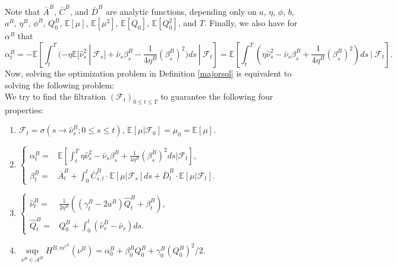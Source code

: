 \documentclass[10pt]{article}
\def \E{\mathbb{E}}
\begin{document}
Note that $\bar A^B$, $\bar C^B$, and $\bar D^B$ are analytic functions, depending only on $a$, $\eta$, $\phi$, $b$, $a^B$, $\eta^B$, $\phi^B$, $Q_0^B$, $\mathbb E[\mu]$, $\mathbb E[\mu^2]$, $\mathbb E[Q_0]$, $\mathbb E[Q_0^2]$, and $T$. 
Finally, we also have for $\alpha^B$ that
$$
\alpha^B_t = -\E\left[ \int_t^T (- \eta \E[ \hat \nu_s^2\ |\ \mathcal F_s] +\bar\nu_s \beta^B_s -  \frac{1}{4\eta^B} (\beta^B_s)^2)ds\ |\ \mathcal F_t\right]
= \E\left[ \int_t^T ( \eta \hat \nu_s^2 - \bar\nu_s \beta^B_s +  \frac{1}{4\eta^B} (\beta^B_s)^2)ds\ |\ \mathcal F_t\right].
$$
Now, solving the optimization problem in Definition \eqref{majorsol} is equivalent to solving the following problem:\\

We try to find the filtration $(\mathcal{F}_t)_{0\leq t \leq T}$ to guarantee the following four properties:
\begin{enumerate}
    \item $\mathcal{F}_t = \sigma(s \to \hat \nu_s^B ; 0\leq s\leq t)$, $\mathbb{E}\left[ \mu  | \mathcal{F}_0 \right] = \mu_0 = \mathbb{E}[\mu]$.
    \item $
    \left\{
    \begin{array}{rl}
        \alpha_t^B = & \mathbb{E}\left[ \int_t^T \eta \hat \nu_s^2 - \bar\nu_s \beta^B_s + \frac{1}{4\eta^B} (\beta^B_s)^2 d s \bigg| \mathcal{F}_t \right], \\
        \beta_t^B = &  \bar A^B_t + \int_0^t \bar C_{s,t}^B \cdot \mathbb{E}\left[ \mu |\mathcal{F}_s \right] d s + \bar D_t^B \cdot \mathbb{E}\left[ \mu | \mathcal{F}_t\right].
    \end{array}
    \right.
    $
    \item $
    \left\{
    \begin{array}{rl}
        \hat\nu_t^B = & \frac{1}{2\eta^B} \left( (\gamma_t^B - 2 a^B) \hat Q_t^B + \beta_t^B \right), \\
        \hat Q_t^B = &  Q_0^B + \int_0^t (\hat \nu_s^B - \bar \nu_s) d s.
    \end{array}
    \right.
    $
    \item $\underset{\nu^B\in \mathcal{A}^B}{\sup}H^{B,m^{\nu^B}}(\nu^B) = \alpha^B_0 +\beta^B_0 Q_0^B+\gamma^B_0(Q_0^B)^2/2 .$
\end{enumerate}
\end{document}
